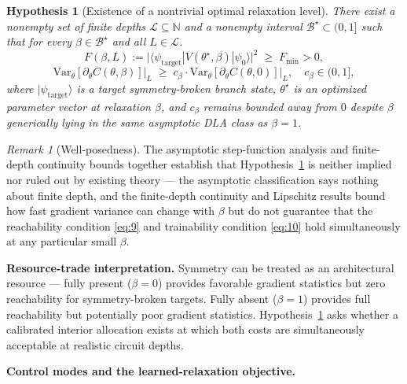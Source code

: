 \documentclass[10pt,twocolumn]{article}
\newtheorem{hypothesis}[definition]{Hypothesis}
\theoremstyle{remark}
\newtheorem{remark}[definition]{Remark}
\begin{document}
\begin{hypothesis}[Existence of a nontrivial optimal relaxation level]
\label{hyp:main}
There exist a nonempty set of finite depths $\mathcal{L} \subseteq \mathbb{N}$ and a nonempty interval $\mathcal{B}^\star \subset (0,1]$ such that for every $\beta \in \mathcal{B}^\star$ and all $L \in \mathcal{L}$.
\begin{equation}
F(\beta, L) := \big|\langle \psi_{\mathrm{target}} | V(\theta^\star,\beta) | \psi_0 \rangle\big|^2 \;\ge\; F_{\min} > 0, \label{eq:9}
\end{equation}
\begin{equation}
\mathrm{Var}_\theta[\partial_\theta C(\theta,\beta)]\big|_L \;\ge\; c_\beta \cdot \mathrm{Var}_\theta[\partial_\theta C(\theta,0)]\big|_L, \quad c_\beta \in (0,1], \label{eq:10}
\end{equation}
where $|\psi_{\mathrm{target}}\rangle$ is a target symmetry-broken branch state, $\theta^\star$ is an optimized parameter vector at relaxation $\beta$, and $c_\beta$ remains bounded away from $0$ despite $\beta$ generically lying in the same asymptotic DLA class as $\beta=1$.
\end{hypothesis}

\begin{remark}[Well-posedness]
\label{rem:wellposed}
The asymptotic step-function analysis and finite-depth continuity bounds together establish that Hypothesis~\ref{hyp:main} is neither implied nor ruled out by existing theory --- the asymptotic classification says nothing about finite depth, and the finite-depth continuity and Lipschitz results bound how fast gradient variance can change with $\beta$ but do not guarantee that the reachability condition \eqref{eq:9} and trainability condition \eqref{eq:10} hold simultaneously at any particular small $\beta$.
\end{remark}

\textbf{Resource-trade interpretation.} Symmetry can be treated as an architectural resource \cite{meyer2023exploiting,schatzki2022theoretical} --- fully present ($\beta=0$) provides favorable gradient statistics but zero reachability for symmetry-broken targets. Fully absent ($\beta=1$) provides full reachability but potentially poor gradient statistics. Hypothesis~\ref{hyp:main} asks whether a calibrated interior allocation exists at which both costs are simultaneously acceptable at realistic circuit depths.

\textbf{Control modes and the learned-relaxation objective.}
\end{document}
